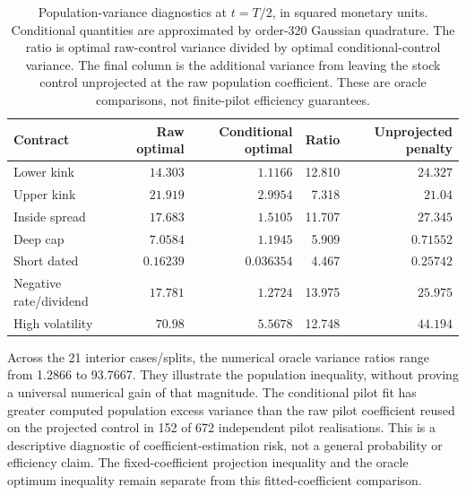 \documentclass[11pt]{article}
\begin{document}
\begin{table}[tb]\centering\small
\begin{tabular}{lrrrr}\toprule
Contract & Raw optimal & Conditional optimal & Ratio & Unprojected penalty\\\midrule
Lower kink & $14.303$ & $1.1166$ & 12.810 & $24.327$ \\
Upper kink & $21.919$ & $2.9954$ & 7.318 & $21.04$ \\
Inside spread & $17.683$ & $1.5105$ & 11.707 & $27.345$ \\
Deep cap & $7.0584$ & $1.1945$ & 5.909 & $0.71552$ \\
Short dated & $0.16239$ & $0.036354$ & 4.467 & $0.25742$ \\
Negative rate/dividend & $17.781$ & $1.2724$ & 13.975 & $25.975$ \\
High volatility & $70.98$ & $5.5678$ & 12.748 & $44.194$ \\
\bottomrule\end{tabular}
\caption{Population-variance diagnostics at $t=T/2$, in squared monetary units. Conditional quantities are approximated by order-320 Gaussian quadrature. The ratio is optimal raw-control variance divided by optimal conditional-control variance. The final column is the additional variance from leaving the stock control unprojected at the raw population coefficient. These are oracle comparisons, not finite-pilot efficiency guarantees.}
\label{tab:cgbm-projection-variance}\end{table}

Across the 21 interior cases/splits, the numerical oracle variance ratios
range from 1.2866 to 93.7667. They illustrate the population inequality,
without proving a universal numerical gain of that magnitude. The
conditional pilot fit has greater computed population excess variance than the
raw pilot coefficient reused on the projected control in 152 of 672
independent pilot realisations. This is a descriptive diagnostic of
coefficient-estimation risk, not a general probability or efficiency claim.
The fixed-coefficient projection inequality and the oracle optimum
inequality remain separate from this fitted-coefficient comparison.
\end{document}
